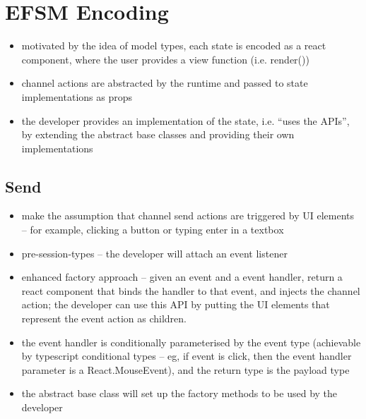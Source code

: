 \section{EFSM Encoding}
\label{section:reactefsm}

\begin{itemize}
\item motivated by the idea of model types, each state is encoded as a react component, where the user provides a view function (i.e. render())
\item channel actions are abstracted by the runtime and passed to state implementations as props
\item the developer provides an implementation of the state, i.e. ``uses the APIs'', by extending the abstract base classes and providing their own implementations
\end{itemize}

\subsection{Send}
\begin{itemize}
\item make the assumption that channel send actions are triggered by UI elements -- for example, clicking a button or typing enter in a textbox
\item pre-session-types -- the developer will attach an event listener
\item enhanced factory approach -- given an event and a event handler, return a react component that binds the handler to that event, and injects the channel action; the developer can use this API by putting the UI elements that represent the event action as children.
\item the event handler is conditionally parameterised by the event type (achievable by typescript conditional types -- eg, if event is click, then the event handler parameter is a React.MouseEvent), and the return type is the payload type
\item the abstract base class will set up the factory methods to be used by the developer
\end{itemize}

